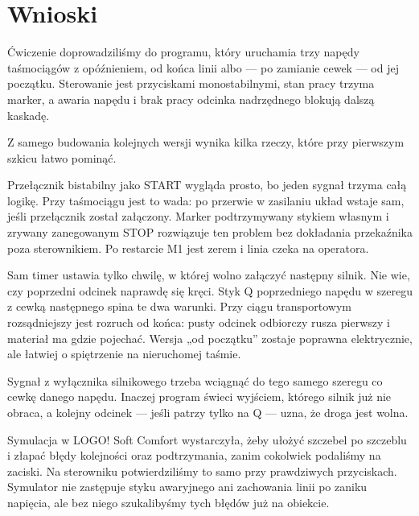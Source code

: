 \section{Wnioski}

Ćwiczenie doprowadziliśmy do programu, który uruchamia trzy napędy taśmociągów z opóźnieniem, od końca linii albo --- po zamianie cewek --- od jej początku. Sterowanie jest przyciskami monostabilnymi, stan pracy trzyma marker, a awaria napędu i brak pracy odcinka nadrzędnego blokują dalszą kaskadę.

Z samego budowania kolejnych wersji wynika kilka rzeczy, które przy pierwszym szkicu łatwo pominąć.

Przełącznik bistabilny jako START wygląda prosto, bo jeden sygnał trzyma całą logikę. Przy taśmociągu jest to wada: po przerwie w zasilaniu układ wstaje sam, jeśli przełącznik został załączony. Marker podtrzymywany stykiem własnym i zrywany zanegowanym STOP rozwiązuje ten problem bez dokładania przekaźnika poza sterownikiem. Po restarcie M1 jest zerem i linia czeka na operatora.

Sam timer ustawia tylko chwilę, w której wolno załączyć następny silnik. Nie wie, czy poprzedni odcinek naprawdę się kręci. Styk Q poprzedniego napędu w szeregu z cewką następnego spina te dwa warunki. Przy ciągu transportowym rozsądniejszy jest rozruch od końca: pusty odcinek odbiorczy rusza pierwszy i materiał ma gdzie pojechać. Wersja „od początku” zostaje poprawna elektrycznie, ale łatwiej o spiętrzenie na nieruchomej taśmie.

Sygnał z wyłącznika silnikowego trzeba wciągnąć do tego samego szeregu co cewkę danego napędu. Inaczej program świeci wyjściem, którego silnik już nie obraca, a kolejny odcinek --- jeśli patrzy tylko na Q --- uzna, że droga jest wolna.

Symulacja w LOGO! Soft Comfort wystarczyła, żeby ułożyć szczebel po szczeblu i złapać błędy kolejności oraz podtrzymania, zanim cokolwiek podaliśmy na zaciski. Na sterowniku potwierdziliśmy to samo przy prawdziwych przyciskach. Symulator nie zastępuje styku awaryjnego ani zachowania linii po zaniku napięcia, ale bez niego szukalibyśmy tych błędów już na obiekcie.
